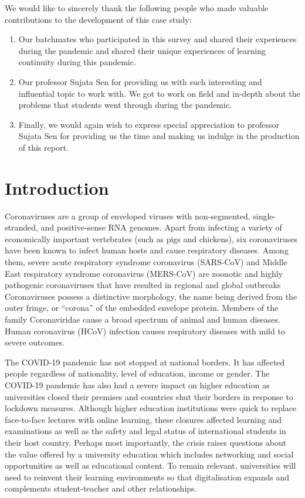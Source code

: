\documentclass[11pt]{scrartcl}
\begin{document}
	We would like to sincerely thank the following people who made valuable contributions to the development of this case study:
	\begin{enumerate}
		\item Our batchmates who participated in this survey and shared their experiences during the pandemic and shared their unique experiences of learning continuity during this pandemic.
		
		\item Our professor Sujata Sen for providing us with such interesting and influential topic to work with. We got to work on field and in-depth about the problems that students went through during the pandemic.
		
		\item Finally, we would again wish to express special appreciation to professor Sujata Sen for providing us the time and making us indulge in the production of this report. 
	\end{enumerate}
	
	\pagebreak
	
	\section{Introduction}
	
	Coronaviruses are a  group of enveloped viruses with non-segmented,  single-stranded,  and positive-sense RNA 
	genomes. Apart from infecting a variety of economically important vertebrates (such as pigs and chickens), six 
	coronaviruses have been known to infect human hosts and cause respiratory diseases. Among them, severe acute 
	respiratory syndrome coronavirus (SARS-CoV) and Middle East respiratory syndrome coronavirus (MERS-CoV) 
	are zoonotic and  highly  pathogenic  coronaviruses  that  have  resulted  in  regional  and  global  outbreaks 
	Coronaviruses possess a distinctive morphology, the name being derived from the outer fringe,  or “corona” of the embedded envelope protein. Members of the family Coronaviridae cause a broad spectrum of animal and human diseases. Human coronavirus (HCoV) infection causes respiratory diseases with mild to severe outcomes.
	
	The COVID-19 pandemic has not stopped at national borders. It has affected people regardless of nationality, level of education, income or gender.
	The COVID-19 pandemic has also had a severe impact on higher education as universities closed their premises and countries shut their borders in response to lockdown measures. Although higher education institutions were quick to replace face-to-face lectures with online learning, these closures affected learning and examinations as well as the safety and legal status of international students in their host country. Perhaps most importantly, the crisis raises questions about the value offered by a university education which includes networking and social opportunities as well as educational content. To remain relevant, universities will need to reinvent their learning environments so that digitalisation expands and complements student-teacher and other relationships.
	
\end{document}
